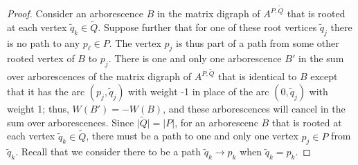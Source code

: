 \documentclass{article}
\begin{document}
\begin{proof}
Consider an arborescence $B$ in the matrix digraph of $A^{P, \tilde{Q}}$ that
is rooted at each vertex $\tilde{q}_k \in \tilde{Q}$.  Suppose further that
for one of these root vertices $\tilde{q}_j$ there is no path to any
$p_\ell \in P$.  The vertex $p_j$ is thus part of a path from some other
rooted vertex of $B$ to $p_j$.  There is one and only one arborescence
 $B'$ in the
sum over arborescences of the matrix digraph of $A^{P, \tilde{Q}}$ that is
identical to $B$ except that it has the arc $(p_j, \tilde{q}_j)$ with weight
-1 in place of the arc $(0, \tilde{q}_j)$ with weight 1; thus,
$W(B') = -W(B)$, and these arborescences will cancel in the sum over
arborescences.
Since $\vert \tilde{Q} \vert = \vert P \vert$, for an arborescenc $B$ that
is rooted at each vertex $\tilde{q}_k \in \tilde{Q}$, there must
be a path to one and only one vertex $p_j \in P$ from $\tilde{q}_k$.
Recall that we consider
there to be a path $\tilde{q}_k \to p_k$ when $\tilde{q}_k = p_k$.


\end{proof}
\end{document}
